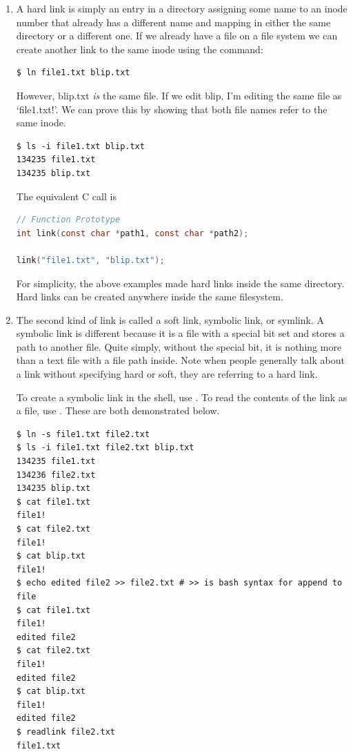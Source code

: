 \begin{enumerate}
    \item {}
        A hard link is simply an entry in a directory assigning some name to an inode number that already has a different name and mapping in either the same directory or a different one.
        If we already have a file on a file system we can create another link to the same inode using the  command:

\begin{lstlisting}[language=bash]
$ ln file1.txt blip.txt
\end{lstlisting}

        However, blip.txt \emph{is} the same file.
        If we edit blip, I'm editing the same file as `file1.txt!'.
        We can prove this by showing that both file names refer to the same inode.

\begin{verbatim}
$ ls -i file1.txt blip.txt
134235 file1.txt
134235 blip.txt
\end{verbatim}

        The equivalent C call is 

\begin{lstlisting}[language=C]
// Function Prototype
int link(const char *path1, const char *path2);

link("file1.txt", "blip.txt");
\end{lstlisting}

        For simplicity, the above examples made hard links inside the same directory.
        Hard links can be created anywhere inside the same filesystem.

    \item {}
        The second kind of link is called a soft link, symbolic link, or symlink.
        A symbolic link is different because it is a file with a special bit set and stores a path to another file.
        Quite simply, without the special bit, it is nothing more than a text file with a file path inside.
        Note when people generally talk about a link without specifying hard or soft, they are referring to a hard link.

        To create a symbolic link in the shell, use .
        To read the contents of the link as a file, use .
        These are both demonstrated below.

\begin{verbatim}
$ ln -s file1.txt file2.txt
$ ls -i file1.txt file2.txt blip.txt
134235 file1.txt
134236 file2.txt
134235 blip.txt
$ cat file1.txt
file1!
$ cat file2.txt
file1!
$ cat blip.txt
file1!
$ echo edited file2 >> file2.txt # >> is bash syntax for append to file
$ cat file1.txt
file1!
edited file2
$ cat file2.txt
file1!
edited file2
$ cat blip.txt
file1!
edited file2
$ readlink file2.txt
file1.txt
\end{verbatim}


\end{enumerate}

